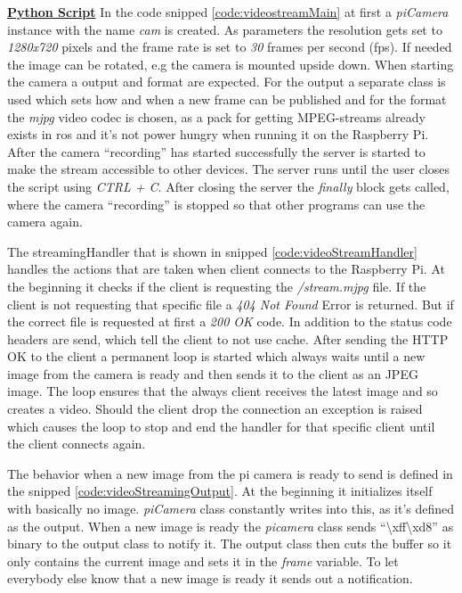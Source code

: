 \textbf{\underline{Python Script}}\newline
In the code snipped \ref{code:videostreamMain} at first a \textit{piCamera} instance with the name \textit{cam} is created. As parameters the resolution gets set to \textit{1280x720} pixels and the frame rate is set to \textit{30} frames per second (\gls{fps}). If needed the image can be rotated, e.g the camera is mounted upside down. When starting the camera a output and format are expected. For the output a separate class is used which sets how and when a new frame can be published and for the format the \textit{mjpg} video codec is chosen, as a pack for getting MPEG-streams already exists in \gls{ros} and it's not power hungry when running it on the Raspberry Pi. \newline
After the camera \enquote{recording} has started successfully the server is started to make the stream accessible to other devices. The server runs until the user closes the script using \textit{CTRL + C}. After closing the server the \textit{finally} block gets called, where the camera \enquote{recording} is stopped so that other programs can use the camera again.


The streamingHandler that is shown in snipped \ref{code:videoStreamHandler} handles the actions that are taken when client connects to the Raspberry Pi. At the beginning it checks if the client is requesting the \textit{/stream.mjpg} file. If the client is not requesting that specific file a \textit{404 Not Found} Error is returned. But if the correct file is requested at first a \textit{200 OK} code. In addition to the status code headers are send, which tell the client to not use cache. After sending the HTTP OK to the client a permanent loop is started which always waits until a new image from the camera is ready and then sends it to the client as an JPEG image. The loop ensures that the always client receives the latest image and so creates a video. Should the client drop the connection an exception is raised which causes the loop to stop and end the handler for that specific client until the client connects again.


The behavior when a new image from the pi camera is ready to send is defined in the snipped \ref{code:videoStreamingOutput}. At the beginning it initializes itself with basically no image. \textit{piCamera} class constantly writes into this, as it's defined as the output. When a new image is ready the \textit{picamera} class sends \enquote{\textbackslash xff\textbackslash xd8} as binary to the output class to notify it. The output class then cuts the buffer so it only contains the current image and sets it in the \textit{frame} variable. To let everybody else know that a new image is ready it sends out a notification.


